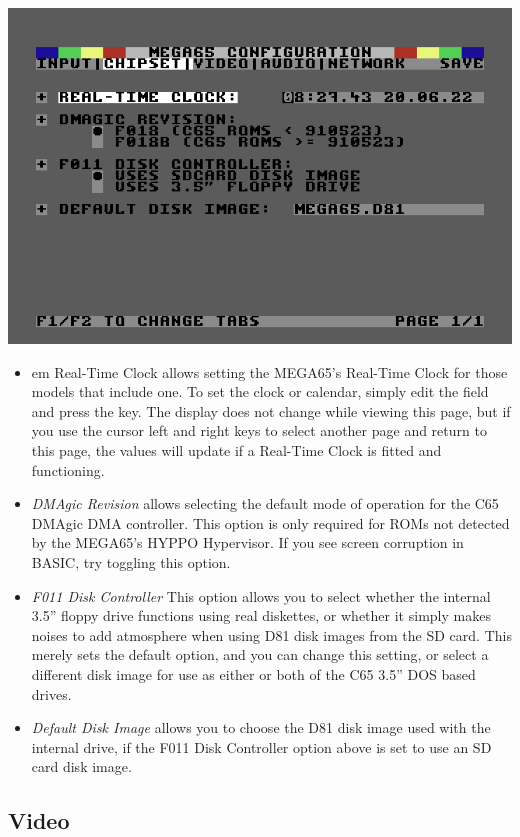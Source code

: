 \includegraphics[width=\linewidth]{images/ss-m65config-2.png}

\begin{itemize}
  \item{em Real-Time Clock} allows setting the MEGA65's Real-Time
    Clock for those models that include one.  To set the clock or
    calendar, simply edit the field and press the 
    key.  The display does not change while viewing this page, but if
    you use the cursor left and right keys to select another page and
    return to this page, the values will update if a Real-Time Clock
    is fitted and functioning.
  \item{\em DMAgic Revision} allows selecting the default mode of
    operation for the C65 DMAgic DMA controller.  This option is only
    required for ROMs not detected by the MEGA65's HYPPO Hypervisor.
    If you see screen corruption in BASIC,
    try toggling this option.
  \item{\em F011 Disk Controller}
    This option allows you to select whether the internal 3.5'' floppy
    drive functions using real diskettes, or whether it simply makes
    noises to add atmosphere when using D81 disk images from the SD
    card.  This merely sets the default option, and you can change
    this setting, or select a different disk image for use as either
    or both of the C65 3.5'' DOS based drives.
  \item{\em Default Disk Image} allows you to choose the D81 disk image
    used with the internal drive, if the F011 Disk
    Controller option above is set to use an SD card disk image.    
\end{itemize}

\subsection{Video}

